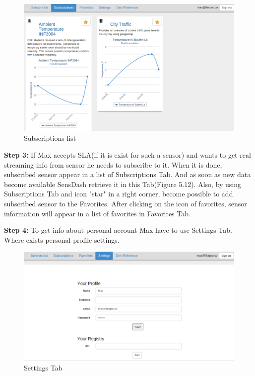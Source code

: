 \begin{figure}[!ht]
\centering
\includegraphics[scale=0.6]{Screenshots/UseCaseScreenshot4.png}   
\caption[Personal Subscribed Sensor]{Subscriptions list}                         
\end{figure}
\textbf{Step 3:} If Max accepts SLA(if it is exist for such a sensor) and wants to get real streaming info from sensor he needs to subscribe to it. When it is done, subscribed sensor appear in a list of Subscriptions Tab. And as soon as new data become available SensDash retrieve it in this Tab(Figure 5.12). Also, by using Subscriptions Tab and icon "star" in a right corner, become possible to add subscribed sensor to the Favorites. After clicking on the icon of favorites, sensor information will appear in a list of favorites in Favorites Tab.

\textbf{Step 4:} To get info about personal account Max have to use Settings Tab. Where exists personal profile settings. 
\begin{figure}[!ht]
\centering
\includegraphics[scale=0.6]{Screenshots/UseCaseScreenshot5.png}   
\caption[Settings Tab]{Settings Tab}                         
\end{figure}

